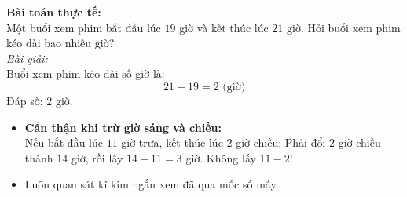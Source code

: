 \documentclass[11pt,a4paper]{article}
\begin{document}
\vspace{-1.5mm}
\noindent
\begin{minipage}[t]{0.49\textwidth}\vspace{0pt}
\begin{tcolorbox}[
  enhanced,
  colback=green!4!white,
  colframe=green!60!black,
  arc=2mm, boxrule=0.8pt,
  left=2mm, right=2mm, top=1.8mm, bottom=1.8mm,
  title={\footnotesize\bfseries\color{white}\faCheckCircle\ 4. Ví dụ thực hành chuẩn mực}
]
{\footnotesize
\textbf{Bài toán thực tế:}\\
Một buổi xem phim bắt đầu lúc $19$ giờ và kết thúc lúc $21$ giờ. Hỏi buổi xem phim kéo dài bao nhiêu giờ?\\
\textit{Bài giải:}\\
Buổi xem phim kéo dài số giờ là:
$$21 - 19 = 2\text{ (giờ)}$$
Đáp số: $2$ giờ.
}
\end{tcolorbox}
\end{minipage}
\hfill
\begin{minipage}[t]{0.49\textwidth}\vspace{0pt}
\begin{tcolorbox}[
  enhanced,
  colback=red!4!white,
  colframe=red!75!black,
  arc=2mm, boxrule=0.8pt,
  left=2mm, right=2mm, top=1.8mm, bottom=1.8mm,
  title={\footnotesize\bfseries\color{white}\faExclamationTriangle\ 5. Mẹo tránh bẫy trắc nghiệm}
]
{\footnotesize
\begin{itemize}\setlength{\itemsep}{1pt}\setlength{\leftskip}{-2.5mm}
  \item \textbf{Cẩn thận khi trừ giờ sáng và chiều:}\\
  Nếu bắt đầu lúc $11$ giờ trưa, kết thúc lúc $2$ giờ chiều: Phải đổi $2$ giờ chiều thành $14$ giờ, rồi lấy $14 - 11 = 3$ giờ. Không lấy $11 - 2$!
  \item Luôn quan sát kĩ kim ngắn xem đã qua mốc số mấy.
\end{itemize}
}
\end{tcolorbox}
\end{minipage}
\end{document}
